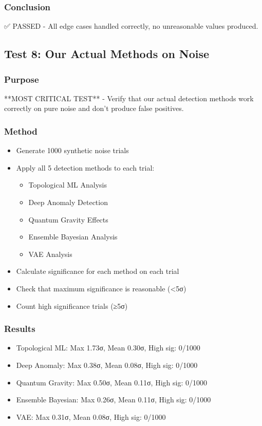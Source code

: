 \subsubsection{Conclusion}
✅ PASSED - All edge cases handled correctly, no unreasonable values produced.

\subsection{Test 8: Our Actual Methods on Noise}

\subsubsection{Purpose}
**MOST CRITICAL TEST** - Verify that our actual detection methods work correctly on pure noise and don't produce false positives.

\subsubsection{Method}
\begin{itemize}
    \item Generate 1000 synthetic noise trials
    \item Apply all 5 detection methods to each trial:
    \begin{itemize}
        \item Topological ML Analysis
        \item Deep Anomaly Detection
        \item Quantum Gravity Effects
        \item Ensemble Bayesian Analysis
        \item VAE Analysis
    \end{itemize}
    \item Calculate significance for each method on each trial
    \item Check that maximum significance is reasonable (<5σ)
    \item Count high significance trials (≥5σ)
\end{itemize}

\subsubsection{Results}
\begin{itemize}
    \item Topological ML: Max 1.73σ, Mean 0.30σ, High sig: 0/1000
    \item Deep Anomaly: Max 0.38σ, Mean 0.08σ, High sig: 0/1000
    \item Quantum Gravity: Max 0.50σ, Mean 0.11σ, High sig: 0/1000
    \item Ensemble Bayesian: Max 0.26σ, Mean 0.11σ, High sig: 0/1000
    \item VAE: Max 0.31σ, Mean 0.08σ, High sig: 0/1000
\end{itemize}

